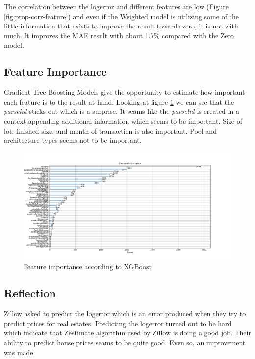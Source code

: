 \documentclass[a4paper]{article}
\begin{document}
The correlation between the logerror and different features are low (Figure \ref{fig:prop-corr-feature}) and even if the Weighted model is utilizing some of the little information that exists to improve the result towards zero, it is not with much. It improves the MAE result with about 1.7\% compared with the Zero model. 


\subsection{Feature Importance}
Gradient Tree Boosting Models give the opportunity to estimate how important each feature is to the result at hand. Looking at figure \ref{fig:feature-importance} we can see that the \textit{parselid} sticks out which is a surprise. It seams like the \textit{parselid} is created in a context appending additional information which seems to be important. Size of lot, finished size, and month of transaction is also important. Pool and architecture types seems not to be important.
\begin{figure}
	\centering
	\includegraphics[width=1.1\textwidth]{./img/feature-importance.png}
	\caption{\label{fig:feature-importance} Feature importance according to XGBoost }
\end{figure}


\subsection{Reflection}
Zillow asked to predict the logerror which is an error produced when they try to predict prices for real estates. Predicting the logerror turned out to be hard which indicate that Zestimate algorithm used by Zillow is doing a good job. Their ability to predict house prices seams to be quite good. Even so, an improvement was made.
\end{document}
